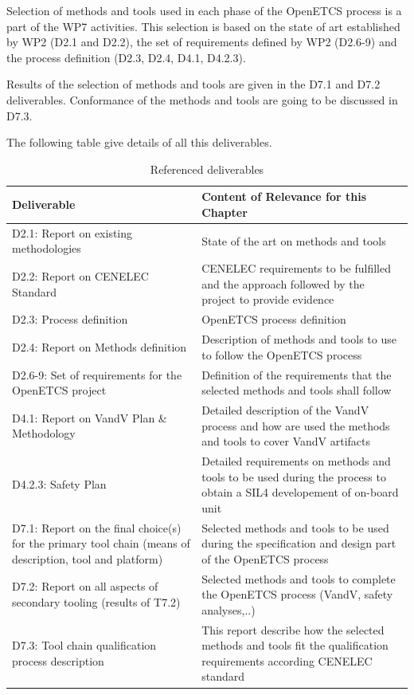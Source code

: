 \documentclass{template/openetcs_article}
\begin{document}
Selection of methods and tools used in each phase of the OpenETCS process is a part of the WP7 activities. This selection is based on the state of art established by WP2 (D2.1 and D2.2), the set of requirements defined by WP2 (D2.6-9) and the process definition (D2.3, D2.4, D4.1, D4.2.3).

Results of the selection of methods and tools are given in the D7.1 and D7.2 deliverables. Conformance of the methods and tools are going to be discussed in D7.3.

The following table give details of all this deliverables.

\begin{table}[H]
\begin{supertabular}{|m{3cm}|m{11cm}|}
\hline
{}
Deliverable &
Content of Relevance for this Chapter\\\hline
D2.1: Report on existing methodologies &
State of the art on methods and tools \\\hline
D2.2: Report on CENELEC Standard &
CENELEC requirements to be fulfilled and the approach followed by the project to provide evidence\\\hline
D2.3: Process definition &
OpenETCS process definition \\\hline
D2.4: Report on Methods definition &
Description of methods and tools to use to follow the OpenETCS process \\\hline
D2.6-9: Set of requirements for the OpenETCS project &
Definition of the requirements that the selected methods and tools shall follow \\\hline
D4.1: Report on \gls{VandV} Plan \& Methodology &
Detailed description of the \gls{VandV} process and how are used the methods and tools to cover \gls{VandV} artifacts \\\hline
D4.2.3: Safety Plan &
Detailed requirements on methods and tools to be used during the process to obtain a \gls{SIL}4 developement of \gls{on-board unit} \\\hline
D7.1: Report on the final choice(s) for the primary tool chain (means of description, tool and platform) &
Selected methods and tools to be used during the specification and design part of the OpenETCS process \\\hline
D7.2: Report on all aspects of secondary tooling (results of T7.2)  &
Selected methods and tools to complete the OpenETCS process (\gls{VandV}, safety analyses,..) \\\hline
D7.3: Tool chain qualification process description &
This report describe how the selected methods and tools fit the qualification requirements according CENELEC standard \\\hline
\end{supertabular}
\caption{Referenced deliverables}
\end{table}
\end{document}
